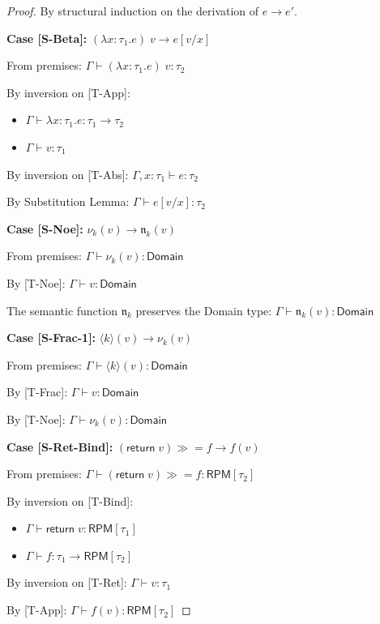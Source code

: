 \documentclass[11pt,twoside,openright]{book}
\theoremstyle{definition}
\theoremstyle{plain}
\theoremstyle{remark}
\newcommand{\noe}[1]{\nu_{#1}}
\newcommand{\rpmret}{\mathsf{return}}
\newcommand{\rpmbind}{\mathbin{\gg\!=}}
\newcommand{\smallstep}{\to}
\begin{document}
\begin{proof}
By structural induction on the derivation of $e \smallstep e'$.

\textbf{Case [S-Beta]:} $(\lambda x:\tau_1. e)\; v \smallstep e[v/x]$

From premises: $\Gamma \vdash (\lambda x:\tau_1. e)\; v : \tau_2$

By inversion on [T-App]:
\begin{itemize}
  \item $\Gamma \vdash \lambda x:\tau_1. e : \tau_1 \to \tau_2$
  \item $\Gamma \vdash v : \tau_1$
\end{itemize}

By inversion on [T-Abs]: $\Gamma, x : \tau_1 \vdash e : \tau_2$

By Substitution Lemma: $\Gamma \vdash e[v/x] : \tau_2$ \checkmark

\textbf{Case [S-Noe]:} $\noe{k}(v) \smallstep \mathfrak{n}_k(v)$

From premises: $\Gamma \vdash \noe{k}(v) : \mathsf{Domain}$

By [T-Noe]: $\Gamma \vdash v : \mathsf{Domain}$

The semantic function $\mathfrak{n}_k$ preserves the Domain type:
$\Gamma \vdash \mathfrak{n}_k(v) : \mathsf{Domain}$ \checkmark

\textbf{Case [S-Frac-1]:} $\langle k \rangle(v) \smallstep \noe{k}(v)$

From premises: $\Gamma \vdash \langle k \rangle(v) : \mathsf{Domain}$

By [T-Frac]: $\Gamma \vdash v : \mathsf{Domain}$

By [T-Noe]: $\Gamma \vdash \noe{k}(v) : \mathsf{Domain}$ \checkmark

\textbf{Case [S-Ret-Bind]:} $(\rpmret\; v) \rpmbind f \smallstep f(v)$

From premises: $\Gamma \vdash (\rpmret\; v) \rpmbind f : \mathsf{RPM}[\tau_2]$

By inversion on [T-Bind]:
\begin{itemize}
  \item $\Gamma \vdash \rpmret\; v : \mathsf{RPM}[\tau_1]$
  \item $\Gamma \vdash f : \tau_1 \to \mathsf{RPM}[\tau_2]$
\end{itemize}

By inversion on [T-Ret]: $\Gamma \vdash v : \tau_1$

By [T-App]: $\Gamma \vdash f(v) : \mathsf{RPM}[\tau_2]$ \checkmark


\end{proof}
\end{document}
